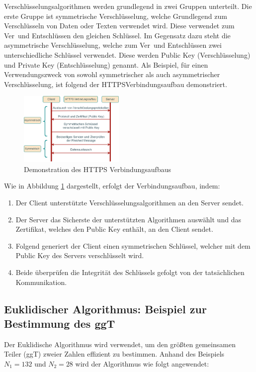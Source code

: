 
Verschlüsselungsalgorithmen werden grundlegend in zwei Gruppen unterteilt.
Die erste Gruppe ist symmetrische Verschlüsselung, welche Grundlegend zum Verschlüsseln von Daten
oder Texten verwendet wird. Diese verwendet zum Ver\textendash\ und Entschlüssen den gleichen Schlüssel.
Im Gegensatz dazu steht die asymmetrische Verschlüsselung, welche zum Ver\textendash\ und Entschlüssen
zwei unterschiedliche Schlüssel verwendet. Diese werden Public Key (Verschlüsselung) und 
Private Key (Entschlüsselung) genannt. Als Beispiel, für einen Verwendungszweck von sowohl symmetrischer als auch 
asymmetrischer Verschlüsselung, ist folgend der HTTPS\textendash Verbindungsaufbau demonstriert.
\begin{figure}[h!]
    \centering
    \includegraphics[width=0.45\textwidth]{sections/paul/https_verbindungsaufbau.drawio.png}
    \caption{Demonstration des HTTPS Verbindungsaufbaus}
    \label{fig:http_verbindungsaufbau}
\end{figure}
Wie in Abbildung \ref{fig:http_verbindungsaufbau} dargestellt, erfolgt der Verbindungsaufbau, indem:
\begin{enumerate}
    \item Der Client unterstützte Verschlüsselungsalgorithmen an den Server sendet.
    \item Der Server das Sicherste der unterstützten Algorithmen auswählt und das Zertifikat, welches den Public Key enthält, an den Client sendet.
    \item Folgend generiert der Client einen symmetrischen Schlüssel, welcher mit dem Public Key des Servers verschlüsselt wird.
    \item Beide überprüfen die Integrität des Schlüssels gefolgt von der tatsächlichen Kommunikation.
\end{enumerate}

\subsection{Euklidischer Algorithmus: Beispiel zur Bestimmung des ggT}

Der Euklidische Algorithmus wird verwendet, um den größten gemeinsamen 
Teiler (ggT) zweier Zahlen effizient zu bestimmen. Anhand des Beispiels 
$N_1 = 132$ und $N_2 = 28$ wird der Algorithmus wie folgt angewendet:

